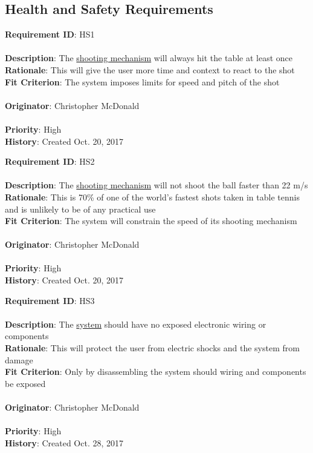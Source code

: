 \documentclass[11pt]{article}
\begin{document}
\subsection{Health and Safety Requirements}
\begin{framed}
	\noindent\textbf{Requirement ID}: HS1 \hfill\\\\
	\noindent\textbf{Description}: The \hyperref[sec:definitions]{shooting mechanism} will always hit the table at least once  \\
	\textbf{Rationale}: This will give the user more time and context to react to the shot \\
	\textbf{Fit Criterion}: The system imposes limits for speed and pitch of the shot \\\\
	\textbf{Originator}: Christopher McDonald \\\\
	\textbf{Priority}: High \hfill \\
	\noindent\textbf{History}: Created Oct. 20, 2017
\end{framed}

\begin{framed}
	\noindent\textbf{Requirement ID}: HS2 \hfill\\\\
	\noindent\textbf{Description}: The \hyperref[sec:definitions]{shooting mechanism} will not shoot the ball faster than 22 m/s \\
	\textbf{Rationale}: This is 70\% of one of the world's fastest shots taken in table tennis and is unlikely to be of any practical use\\
	\textbf{Fit Criterion}: The system will constrain the speed of its shooting mechanism \\\\
	\textbf{Originator}: Christopher McDonald \\\\
	\textbf{Priority}: High \hfill \\
	\noindent\textbf{History}: Created Oct. 20, 2017
\end{framed}

\begin{framed}
	\noindent\textbf{Requirement ID}: HS3 \hfill\\\\
	\noindent\textbf{Description}: The \hyperref[sec:definitions]{system} should have no exposed electronic wiring or components \\
	\textbf{Rationale}: This will protect the user from electric shocks and the system from damage \\
	\textbf{Fit Criterion}: Only by disassembling the system should wiring and components be exposed \\\\
	\textbf{Originator}: Christopher McDonald \\\\
	\textbf{Priority}: High \hfill \\
	\noindent\textbf{History}: Created Oct. 28, 2017
\end{framed}
\end{document}
